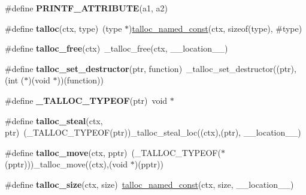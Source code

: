 \begin{DoxyCompactItemize}
\item 
\hypertarget{group__talloc_gaf41a0a9441b1da20577215063408402f}{}\#define {\bfseries P\+R\+I\+N\+T\+F\+\_\+\+A\+T\+T\+R\+I\+B\+U\+T\+E}(a1,  a2)\label{group__talloc_gaf41a0a9441b1da20577215063408402f}

\item 
\hypertarget{group__talloc_gafe346eee9b905819ea950bda14456e14}{}\#define {\bfseries talloc}(ctx,  type)~(type $\ast$)\hyperlink{group__talloc_ga72dc3f21af6c125c71221860c5d9fd36}{talloc\+\_\+named\+\_\+const}(ctx, sizeof(type), \#type)\label{group__talloc_gafe346eee9b905819ea950bda14456e14}

\item 
\hypertarget{group__talloc_gac4d90a81e4d1cde1b334007639aac861}{}\#define {\bfseries talloc\+\_\+free}(ctx)~\+\_\+talloc\+\_\+free(ctx, \+\_\+\+\_\+location\+\_\+\+\_\+)\label{group__talloc_gac4d90a81e4d1cde1b334007639aac861}

\item 
\hypertarget{group__talloc_gad3d04b1322f92d5583e72f67d864d49b}{}\#define {\bfseries talloc\+\_\+set\+\_\+destructor}(ptr,  function)~\+\_\+talloc\+\_\+set\+\_\+destructor((ptr), (int ($\ast$)(void $\ast$))(function))\label{group__talloc_gad3d04b1322f92d5583e72f67d864d49b}

\item 
\hypertarget{group__talloc_ga3f276c1615178e82165da44b3b67221b}{}\#define {\bfseries \+\_\+\+T\+A\+L\+L\+O\+C\+\_\+\+T\+Y\+P\+E\+O\+F}(ptr)~void $\ast$\label{group__talloc_ga3f276c1615178e82165da44b3b67221b}

\item 
\hypertarget{group__talloc_ga6c827f7b3f7e609e07a1eb22b78e3705}{}\#define {\bfseries talloc\+\_\+steal}(ctx,  ptr)~(\+\_\+\+T\+A\+L\+L\+O\+C\+\_\+\+T\+Y\+P\+E\+O\+F(ptr))\+\_\+talloc\+\_\+steal\+\_\+loc((ctx),(ptr), \+\_\+\+\_\+location\+\_\+\+\_\+)\label{group__talloc_ga6c827f7b3f7e609e07a1eb22b78e3705}

\item 
\hypertarget{group__talloc_gaa819720a073d6c24179d49f4db06b880}{}\#define {\bfseries talloc\+\_\+move}(ctx,  pptr)~(\+\_\+\+T\+A\+L\+L\+O\+C\+\_\+\+T\+Y\+P\+E\+O\+F($\ast$(pptr)))\+\_\+talloc\+\_\+move((ctx),(void $\ast$)(pptr))\label{group__talloc_gaa819720a073d6c24179d49f4db06b880}

\item 
\hypertarget{group__talloc_ga1e6b0d2b1ea5861ad0cdcb9ba44a27cd}{}\#define {\bfseries talloc\+\_\+size}(ctx,  size)~\hyperlink{group__talloc_ga72dc3f21af6c125c71221860c5d9fd36}{talloc\+\_\+named\+\_\+const}(ctx, size, \+\_\+\+\_\+location\+\_\+\+\_\+)\label{group__talloc_ga1e6b0d2b1ea5861ad0cdcb9ba44a27cd}


\end{DoxyCompactItemize}
